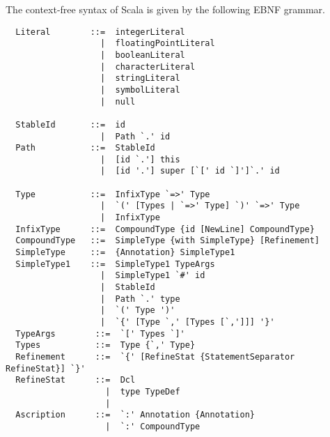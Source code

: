 The context-free syntax of Scala is given by the following EBNF
grammar.

\begin{lstlisting}
  Literal        ::=  integerLiteral
                   |  floatingPointLiteral
                   |  booleanLiteral
                   |  characterLiteral
                   |  stringLiteral
                   |  symbolLiteral
                   |  null

  StableId       ::=  id
                   |  Path `.' id
  Path           ::=  StableId
                   |  [id `.'] this
                   |  [id '.'] super [`[' id `]']`.' id

  Type           ::=  InfixType `=>' Type
                   |  `(' [Types | `=>' Type] `)' `=>' Type
                   |  InfixType
  InfixType      ::=  CompoundType {id [NewLine] CompoundType}
  CompoundType   ::=  SimpleType {with SimpleType} [Refinement]
  SimpleType     ::=  {Annotation} SimpleType1
  SimpleType1    ::=  SimpleType1 TypeArgs
                   |  SimpleType1 `#' id
                   |  StableId
                   |  Path `.' type
                   |  `(' Type ')'
                   |  `{' [Type `,' [Types [`,']]] '}'
  TypeArgs        ::=  `[' Types `]'
  Types           ::=  Type {`,' Type}
  Refinement      ::=  `{' [RefineStat {StatementSeparator RefineStat}] `}'
  RefineStat      ::=  Dcl
                    |  type TypeDef
                    |
  Ascription      ::=  `:' Annotation {Annotation} 
                    |  `:' CompoundType


\end{lstlisting}
